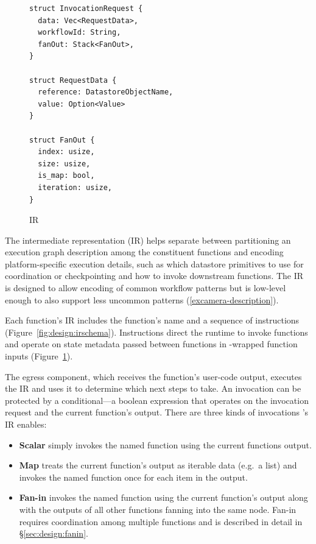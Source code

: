 \begin{figure}[t!]
    \centering
    \begin{verbatim}
struct InvocationRequest {
  data: Vec<RequestData>,
  workflowId: String,
  fanOut: Stack<FanOut>,
}

struct RequestData {
  reference: DatastoreObjectName,
  value: Option<Value>
}

struct FanOut {
  index: usize,
  size: usize,
  is_map: bool,
  iteration: usize,
}
    \end{verbatim}
    \caption{\name{} IR}
    \label{fig:design:unum-request}
\end{figure}

The \name{} intermediate representation (IR) helps separate between partitioning
an execution graph description among the constituent functions and encoding
platform-specific execution details, such as which datastore primitives to
use for coordination or checkpointing and how to invoke downstream functions.
The IR is designed to allow encoding of common workflow patterns but is
low-level enough to also support less uncommon patterns
(\ref{excamera-description}).

Each function's IR includes the function's name and a sequence of instructions
(Figure~\ref{fig:design:irschema}). Instructions direct the runtime to invoke
functions and operate on state metadata passed between functions in
\name{}-wrapped function inputs (Figure~\ref{fig:design:unum-request}).

The egress component, which receives the function's user-code output, executes
the IR and uses it to determine which next steps to take. An invocation can be
protected by a conditional---a boolean expression that operates on the
invocation request and the current function's output. There are three kinds of
invocations \name{}'s IR enables:

\begin{itemize}
  \item \textbf{Scalar} simply invokes the named function using the
        current functions output.
  \item \textbf{Map} treats the current function's output as iterable data
        (e.g.\ a list) and invokes the named function once for each item in the
        output.
  \item \textbf{Fan-in} invokes the named function using the current function's
        output along with the outputs of all other functions fanning into the
        same node. Fan-in requires coordination among multiple functions and is
        described in detail in \S\ref{sec:design:fanin}.
\end{itemize}

